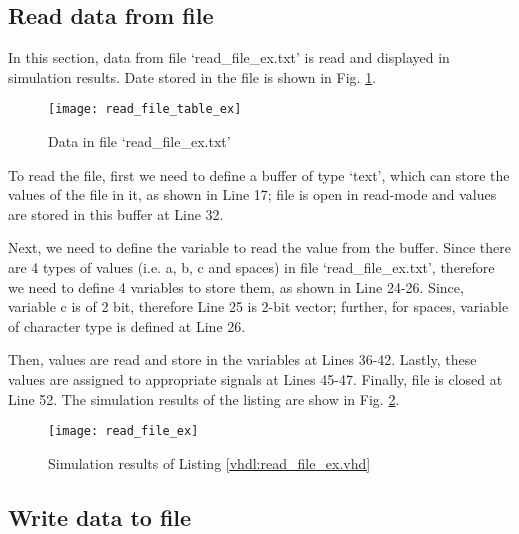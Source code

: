 \subsection{Read data from file} \label{sec_read_data_from_file}

In this section, data from file `read\_file\_ex.txt' is read and displayed in simulation results. Date stored in the file is shown in Fig. \ref{fig:read_file_table_ex}. 

\begin{figure}[!h]
	\centering
	\texttt{[image: read\_file\_table\_ex]}
	\caption{Data in file  `read\_file\_ex.txt'}
	\label{fig:read_file_table_ex}
\end{figure}

\begin{explanation}
	To read the file, first we need to define a buffer of type `text', which can store the values of the file in it, as shown in Line 17; file is open in read-mode and values are stored in this buffer at Line 32.  
	
	Next, we need to define the variable to read the value from the buffer. Since there are 4 types of values (i.e. a, b, c and spaces) in file `read\_file\_ex.txt', therefore we need to define 4 variables to store them, as shown in Line 24-26. Since, variable c is of 2 bit, therefore Line 25 is 2-bit vector; further, for spaces, variable of character type is defined at Line 26. 
	
	Then, values are read and store in the variables at Lines 36-42. Lastly, these values are assigned to appropriate signals at Lines 45-47. Finally, file is closed at Line 52. The simulation results of the listing are show in Fig. \ref{fig:read_file_ex}. 
\end{explanation}



\begin{figure}[!h]
	\centering
	\texttt{[image: read\_file\_ex]}
	\caption{Simulation results of Listing \ref{vhdl:read_file_ex.vhd} }
	\label{fig:read_file_ex}
\end{figure}


\subsection{Write data to file}\label{sec:writedatafile}

